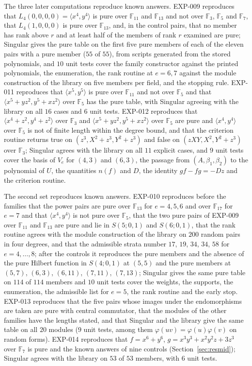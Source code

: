 \documentclass[11pt]{article}
\theoremstyle{definition}
\theoremstyle{remark}
\newcommand{\EXP}[1]{\mbox{EXP-#1}}
\newcommand{\F}{\mathbb{F}}
\begin{document}
The three later computations reproduce known answers. \EXP{009} reproduces that $L_4(0,0,0,0)=\langle x^4,y^4\rangle$ is pure over $\F_{11}$ and $\F_{13}$ and not over $\F_3$, $\F_5$ and $\F_7$, that $L_4(1,0,0,0)$ is pure over $\F_{13}$, and, in the control pairs, that no member has rank above $r$ and at least half of the members of rank $r$ examined are pure; Singular gives the pure table on the first five pure members of each of the eleven pairs with a pure member ($55$ of $55$), from scripts generated from the stored polynomials, and $10$ unit tests cover the family constructor against the printed polynomials, the enumeration, the rank routine at $e=6,7$ against the module construction of the library on five members per field, and the stopping rule. \EXP{011} reproduces that $\langle x^5,y^5\rangle$ is pure over $\F_{11}$ and not over $\F_5$ and that $\langle x^5+yz^2,y^5+xz^2\rangle$ over $\F_5$ has the pure table, with Singular agreeing with the library on all $16$ cases and $6$ unit tests. \EXP{012} reproduces that $\langle x^4+z^2,y^4+z^2\rangle$ over $\F_3$ and $\langle x^5+yz^2,y^5+xz^2\rangle$ over $\F_5$ are pure and $\langle x^4,y^4\rangle$ over $\F_5$ is not of finite length within the degree bound, and that the criterion routine returns true on $(z^3,X^2+z^3,Y^2+z^3)$ and false on $(zXY,X^2,Y^2+z^3)$ over $\F_3$; Singular agrees with the library on all $11$ explicit cases, and $9$ unit tests cover the basis of $V_e$ for $(4,3)$ and $(6,3)$, the passage from $(A,\beta_1,\beta_2)$ to the polynomial of $U$, the quantities $n(f)$ and $D$, the identity $gf-fg=-Dz$ and the criterion routine.

The second set reproduces known answers. \EXP{010} reproduces before the families that the power pairs are pure over $\F_{13}$ for $e=4,5,6$ and over $\F_{17}$ for $e=7$ and that $\langle x^4,y^4\rangle$ is not pure over $\F_5$, that the two pure pairs of \EXP{009} over $\F_{11}$ and $\F_{13}$ are pure and lie in $S(5;0,1)$ and $S(6;0,1)$, that the rank routine agrees with the module construction of the library on $200$ random pairs in four degrees, and that the admissible strata number $17$, $19$, $34$, $34$, $58$ for $e=4,\dots,8$; after the controls it reproduces the pure members and the absence of the pure Hilbert function in $S(4;0,1)$ at $(5,5)$ and the pure members at $(5,7)$, $(6,3)$, $(6,11)$, $(7,11)$, $(7,13)$; Singular gives the same pure table on $114$ of $114$ members and $10$ unit tests cover the weights, the supports, the enumeration, the admissible list for $e=5$, the rank routine and the early stop. \EXP{013} reproduces that the five pairs whose images under the endomorphisms are taken are pure with central commutator, that the modules of the other families have the lengths stated, and that Singular and the library give the same table on all $20$ modules ($9$ unit tests, among them $\varphi(uv)=\varphi(u)\varphi(v)$ on random forms). \EXP{014} reproduces that $f=x^6+y^6$, $g=x^3y^3+x^2y^2z+3z^3$ over $\F_7$ is pure and the known answers of nine controls (Section~\ref{sec:resmid}); Singular agrees with the library on $53$ of $53$ members, with $6$ unit tests.
\end{document}
